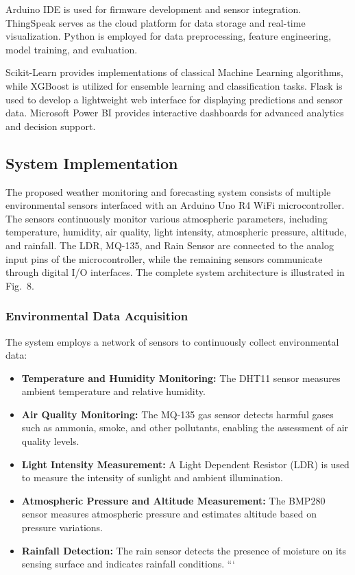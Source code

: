 \documentclass[conference]{IEEEtran}
\begin{document}
Arduino IDE is used for firmware development and sensor integration. ThingSpeak serves as the cloud platform for data storage and real-time visualization. Python is employed for data preprocessing, feature engineering, model training, and evaluation.

Scikit-Learn provides implementations of classical Machine Learning algorithms, while XGBoost is utilized for ensemble learning and classification tasks. Flask is used to develop a lightweight web interface for displaying predictions and sensor data. Microsoft Power BI provides interactive dashboards for advanced analytics and decision support.

\subsection{System Implementation}

The proposed weather monitoring and forecasting system consists of multiple environmental sensors interfaced with an Arduino Uno R4 WiFi microcontroller. The sensors continuously monitor various atmospheric parameters, including temperature, humidity, air quality, light intensity, atmospheric pressure, altitude, and rainfall. The LDR, MQ-135, and Rain Sensor are connected to the analog input pins of the microcontroller, while the remaining sensors communicate through digital I/O interfaces. The complete system architecture is illustrated in Fig.~8.

\subsubsection{Environmental Data Acquisition}

The system employs a network of sensors to continuously collect environmental data:

\begin{itemize}
\item \textbf{Temperature and Humidity Monitoring:} The DHT11 sensor measures ambient temperature and relative humidity.

\item \textbf{Air Quality Monitoring:} The MQ-135 gas sensor detects harmful gases such as ammonia, smoke, and other pollutants, enabling the assessment of air quality levels.

\item \textbf{Light Intensity Measurement:} A Light Dependent Resistor (LDR) is used to measure the intensity of sunlight and ambient illumination.

\item \textbf{Atmospheric Pressure and Altitude Measurement:} The BMP280 sensor measures atmospheric pressure and estimates altitude based on pressure variations.

\item \textbf{Rainfall Detection:} The rain sensor detects the presence of moisture on its sensing surface and indicates rainfall conditions.
```

\end{itemize}
\end{document}
